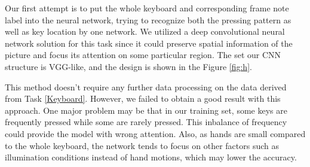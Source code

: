\documentclass[10pt,twocolumn,letterpaper]{article}
\begin{document}
   Our first attempt is to put the whole keyboard and corresponding frame note label into the neural network, trying to recognize both the pressing pattern as well as key location by one network.
   We utilized a deep convolutional neural network solution for this task since it could preserve spatial information of the picture and focus its attention on some particular region.
   The set our CNN structure is VGG-like, and the design is shown in the Figure \ref{fig:h}.

   This method doesn't require any further data processing on the data derived from Task \ref{Keyboard}.
   However, we failed to obtain a good result with this approach. 
   One major problem may be that in our training set, some keys are frequently pressed while some are rarely pressed.
   This inbalance of frequency could provide the model with wrong attention.
   Also, as hands are small compared to the whole keyboard, the network tends to focus on other factors such as illumination conditions instead of hand motions, which may lower the accuracy.
\end{document}
